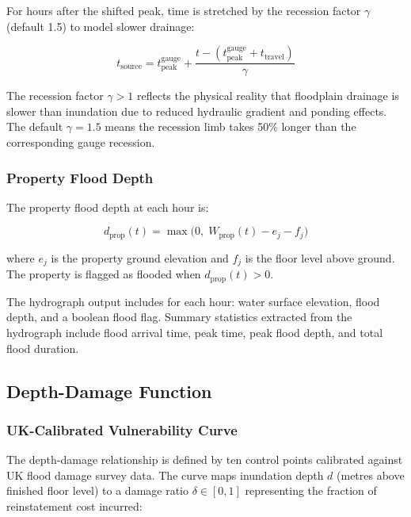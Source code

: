 \documentclass[11pt,a4paper]{article}
\begin{document}
For hours after the shifted peak, time is stretched by the recession factor
$\gamma$ (default 1.5) to model slower drainage:

\begin{equation}
    t_{\text{source}} = t_{\text{peak}}^{\text{gauge}} +
    \frac{t - (t_{\text{peak}}^{\text{gauge}} + t_{\text{travel}})}{\gamma}
    \label{eq:recession}
\end{equation}

\noindent The recession factor $\gamma > 1$ reflects the physical reality that
floodplain drainage is slower than inundation due to reduced hydraulic gradient and
ponding effects. The default $\gamma = 1.5$ means the recession limb takes 50\%
longer than the corresponding gauge recession.

\subsubsection{Property Flood Depth}

The property flood depth at each hour is:

\begin{equation}
    d_{\text{prop}}(t) = \max\!\big(0, \; W_{\text{prop}}(t) - e_j - f_j\big)
    \label{eq:prop_depth}
\end{equation}

\noindent where $e_j$ is the property ground elevation and $f_j$ is the floor level
above ground. The property is flagged as flooded when $d_{\text{prop}}(t) > 0$.

The hydrograph output includes for each hour: water surface elevation, flood depth,
and a boolean flood flag. Summary statistics extracted from the hydrograph include
flood arrival time, peak time, peak flood depth, and total flood duration.

\subsection{Depth-Damage Function}
\label{sec:depth_damage}

\subsubsection{UK-Calibrated Vulnerability Curve}

The depth-damage relationship is defined by ten control points calibrated against UK
flood damage survey data. The curve maps inundation depth $d$ (metres above finished
floor level) to a damage ratio $\delta \in [0,1]$ representing the fraction of
reinstatement cost incurred:
\end{document}
